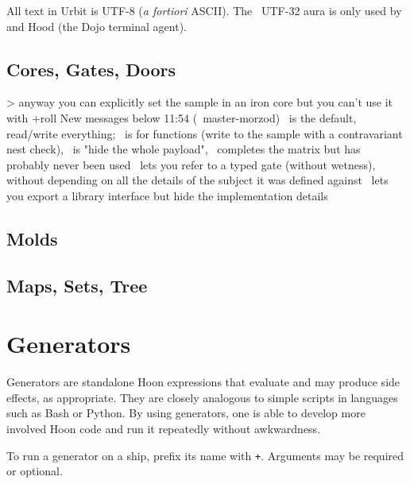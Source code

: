 

All text in Urbit is UTF-8 (\emph{a fortiori} ASCII).  The \patc~UTF-32 aura is only used by \dill and Hood (the Dojo terminal agent).


\subsection{Cores, Gates, Doors}

> anyway you can explicitly set the sample in an iron core
but you can't use it with +roll
New messages below
11:54 (~master-morzod)
\gold~is the default, read/write everything; \iron~is for functions (write to the sample with a contravariant nest check), \lead~is "hide the whole payload", \zinc~completes the matrix
but has probably never been used
\iron~lets you refer to a typed gate (without wetness), without depending on all the details of the subject it was defined against
\lead~lets you export a library interface but hide the implementation details

\subsection{Molds}

\subsection{Maps, Sets, Tree}

\section{Generators}

Generators are standalone Hoon expressions that evaluate and may produce side effects, as appropriate.  They are closely analogous to simple scripts in languages such as Bash or Python.  By using generators, one is able to develop more involved Hoon code and run it repeatedly without awkwardness.


To run a generator on a ship, prefix its name with \texttt{+}.  Arguments may be required or optional.

